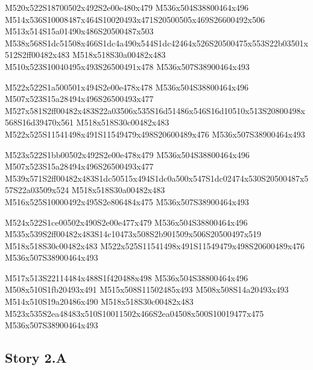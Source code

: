\documentclass{article}
\begin{document}
\begin{multicols}{5}
\begin{center}
M520x522S18700502x492S2e00e480x479 %
M536x504S38800464x496 %
M514x536S10008487x464S10020493x471S20500505x469S26600492x506 %
M513x514S15a01490x486S20500487x503 %
M538x568S1dc51508x466S1dc4a490x544S1dc42464x526S20500475x553S22b03501x512S2ff00482x483 %
M518x518S30a00482x483 %
M510x523S10040495x493S26500491x478 %
M536x507S38900464x493 %
\vfil
\columnbreak

M522x522S1a500501x494S2e00e478x478 %
M536x504S38800464x496 %
M507x523S15a28494x496S26500493x477 %
M527x581S2ff00482x483S22a03506x535S16d51486x546S16d10510x513S20800498x568S16d39470x561 %
M518x518S30c00482x483 %
M522x525S11541498x491S11549479x498S20600489x476 %
M536x507S38900464x493 %
\vfil
\columnbreak

M523x522S1bb00502x492S2e00e478x479 %
M536x504S38800464x496 %
M507x523S15a28494x496S26500493x477 %
M539x571S2ff00482x483S1dc50515x494S1dc0a500x547S1dc02474x530S20500487x557S22a03509x524 %
M518x518S30a00482x483 %
M516x525S10000492x495S2e806484x475 %
M536x507S38900464x493 %
\vfil
\columnbreak

M524x522S1ce00502x490S2e00e477x479 %
M536x504S38800464x496 %
M535x539S2ff00482x483S14c10473x508S2b901509x506S20500497x519 %
M518x518S30c00482x483 %
M522x525S11541498x491S11549479x498S20600489x476 %
M536x507S38900464x493 %
\vfil
\columnbreak

M517x513S22114484x488S1f420488x498 %
M536x504S38800464x496 %
M508x510S1fb20493x491 %
M515x508S11502485x493 %
M508x508S14a20493x493 %
M514x510S19a20486x490 %
M518x518S30c00482x483 %
M523x535S2ea48483x510S10011502x466S2ea04508x500S10019477x475 %
M536x507S38900464x493 %
\end{center}
\end{multicols}

\subsection{Story 2.A}
\end{document}
